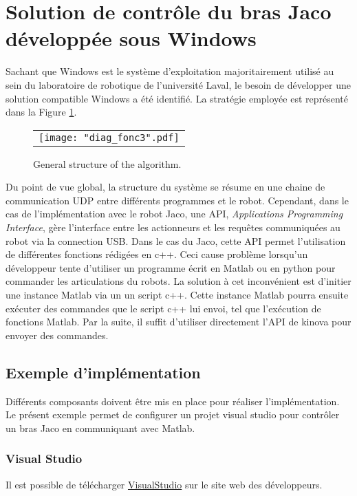 \documentclass[root.tex]{subfiles}
\begin{document}
\section{Solution de contrôle du bras Jaco développée sous Windows}

Sachant que Windows est le système d'exploitation majoritairement utilisé au sein du laboratoire de robotique de l'université Laval, le besoin de développer une solution compatible Windows a été identifié. 
La stratégie employée est représenté dans la Figure \ref{fig:diag}.
\begin{figure}
 \begin{center}
  \begin{tabular}{c}
    \texttt{[image: "diag\_fonc3".pdf]}
  \end{tabular}
 \end{center}
\caption{General structure of the algorithm.}
 \label{fig:diag}
\end{figure}
Du point de vue global, la structure du système se résume en une chaine de communication UDP entre différents programmes et le robot. 
Cependant, dans le cas de l'implémentation avec le robot Jaco, une API, \textit{Applications Programming Interface}, gère l'interface entre les actionneurs et les requêtes communiquées au robot via la connection USB.
Dans le cas du Jaco, cette API permet l'utilisation de différentes fonctions rédigées en c++.
Ceci cause problème lorsqu'un développeur tente d'utiliser un programme écrit en Matlab ou en python pour commander les articulations du robots.
La solution à cet inconvénient est d'initier une instance Matlab via un un script c++.
Cette instance Matlab pourra ensuite exécuter des commandes que le script c++ lui envoi, tel que l’exécution de fonctions Matlab.
Par la suite, il suffit d'utiliser directement l'API de kinova pour envoyer des commandes.

\subsection{Exemple d'implémentation}

Différents composants doivent être mis en place pour réaliser l'implémentation.
Le présent exemple permet de configurer un projet visual studio pour contrôler un bras Jaco en communiquant avec Matlab.
\subsubsection{Visual Studio}
Il est possible de télécharger \href{https://www.visualstudio.com/thank-you-downloading-visual-studio/?sku=Community&rel=15}{VisualStudio} sur le site web des développeurs.
\end{document}
